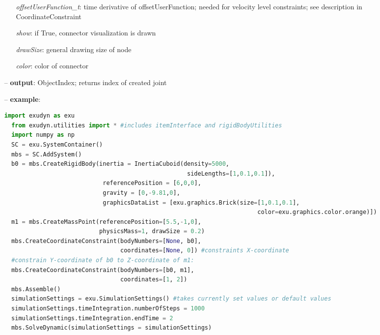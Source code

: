 \begin{itemize}[leftmargin=0.7cm]
\begin{itemize}[leftmargin=1.2cm]
\item[]{\it offsetUserFunction\_t}: time derivative of offsetUserFunction; needed for velocity level constraints; see description in CoordinateConstraint
\item[]{\it show}: if True, connector visualization is drawn
\item[]{\it drawSize}: general drawing size of node
\item[]{\it color}: color of connector
\end{itemize}
\item[--]
{\bf output}: ObjectIndex; returns index of created joint
\item[--]
{\bf example}: \vspace{-12pt}\ei\begin{lstlisting}[language=Python, xleftmargin=36pt]
  import exudyn as exu
  from exudyn.utilities import * #includes itemInterface and rigidBodyUtilities
  import numpy as np
  SC = exu.SystemContainer()
  mbs = SC.AddSystem()
  b0 = mbs.CreateRigidBody(inertia = InertiaCuboid(density=5000,
                                                    sideLengths=[1,0.1,0.1]),
                            referencePosition = [6,0,0],
                            gravity = [0,-9.81,0],
                            graphicsDataList = [exu.graphics.Brick(size=[1,0.1,0.1],
                                                                        color=exu.graphics.color.orange)])
  m1 = mbs.CreateMassPoint(referencePosition=[5.5,-1,0],
                           physicsMass=1, drawSize = 0.2)
  mbs.CreateCoordinateConstraint(bodyNumbers=[None, b0],
                                 coordinates=[None, 0]) #constraints X-coordinate
  #constrain Y-coordinate of b0 to Z-coordinate of m1:
  mbs.CreateCoordinateConstraint(bodyNumbers=[b0, m1],
                                 coordinates=[1, 2])
  mbs.Assemble()
  simulationSettings = exu.SimulationSettings() #takes currently set values or default values
  simulationSettings.timeIntegration.numberOfSteps = 1000
  simulationSettings.timeIntegration.endTime = 2
  mbs.SolveDynamic(simulationSettings = simulationSettings)
\end{lstlisting}\vspace{-24pt}\bi\item[]\vspace{-24pt}\vspace{12pt}\end{itemize}
%

